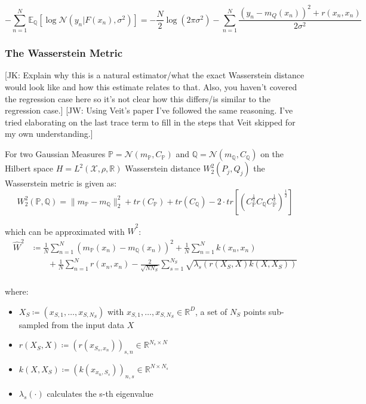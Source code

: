 \documentclass[twoside,11pt]{article}
\newcommand{\jk}[1]{{\color{blue} [JK: #1]}}
\newcommand{\jw}[1]{{\color{gray} [JW: #1]}}
\begin{document}
\[-\sum_{n=1}^N \mathbb{E}_{\mathbb{Q}}\left[ \log \mathcal{N}(y_n |F(x_n), \sigma^2)\right] = -\frac{N}{2} \log(2\pi \sigma^2) -\sum_{n=1}^N \frac{(y_n-m_Q(x_n))^2 + r(x_n, x_n)}{2\sigma^2} \]

\subsubsection{The Wasserstein Metric}\label{subsec:gwi-for-regression-wasserstein-metric}
%
\jk{Explain why this is a natural estimator/what the exact Wasserstein distance would look like and how this estimate relates to that. Also, you haven't covered the regression case here so it's not clear how this differs/is similar to the regression case.}
\jw{Using Veit's paper I've followed the same reasoning. I've tried elaborating on the last trace term to fill in the steps that Veit skipped for my own understanding.}
%

For two Gaussian Measures $\mathbb{P} = \mathcal{N}(m_{\mathbb{P}}, C_{\mathbb{P}})$ and $\mathbb{Q} = \mathcal{N}(m_{\mathbb{Q}}, C_{\mathbb{Q}})$ on the Hilbert space $H=L^2(\mathcal{X}, \rho, \mathbb{R})$ Wasserstein distance $W_2^2(P_j, Q_j)$ the Wasserstein metric is given as:
\[W_2^2(\mathbb{P}, \mathbb{Q}) = \|m_{\mathbb{P}} - m_{\mathbb{Q}}\|_2^2 + tr(C_{\mathbb{P}}) + tr(C_{\mathbb{Q}}) - 2 \cdot tr \left[ \left( C_{\mathbb{P}}^{\frac{1}{2}}C_{\mathbb{Q}}C_{\mathbb{P}}^{\frac{1}{2}}\right)^{\frac{1}{2}}\right]\]

which can be approximated with $\hat{W}^2$:
\[
\begin{split}
\hat{W}^2 & \coloneqq \frac{1}{N}\sum_{n=1}^N (m_{\mathbb{P}}(x_n)-m_{\mathbb{Q}}(x_n))^2 + \frac{1}{N}\sum_{n=1}^{N}k(x_n, x_n) \\
 &\qquad +\frac{1}{N}\sum_{n=1}^{N}r(x_n, x_n) - \frac{2}{\sqrt {N N_S}}\sum_{s=1}^{N_S}\sqrt {\lambda_s(r(X_S, X)k(X, X_S))} \\
\end{split}
\]

where:
\begin{itemize}
    \item $X_S \coloneqq (x_{S, 1}, \dots, x_{S, N_S})$ with $x_{S, 1}, \dots, x_{S, N_S} \in \mathbb{R}^D$, a set of $N_S$ points sub-sampled from the input data $X$
    \item $r(X_S, X) \coloneqq \left(r(x_{S_s, x_n})\right)_{s, n} \in \mathbb{R}^{N_s \times N}$
    \item $k(X, X_S) \coloneqq \left(k(x_{x_n, S_s})\right)_{n, s} \in \mathbb{R}^{N \times N_s}$
    \item $\lambda_s(\cdot)$ calculates the s-th eigenvalue
\end{itemize}
\end{document}
